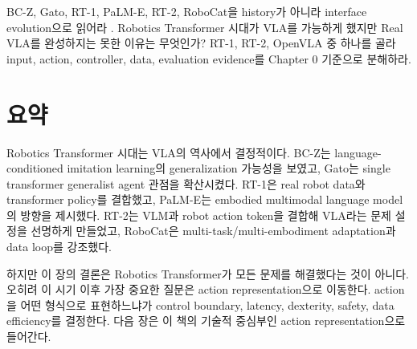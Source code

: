 \chapterwork
{BC-Z, Gato, RT-1, PaLM-E, RT-2, RoboCat을 history가 아니라 interface evolution으로 읽어라 \cite{bcz2022,gato2022,rt12022,palme2023,rt22023,robocat2023}.}
{Robotics Transformer 시대가 VLA를 가능하게 했지만 Real VLA를 완성하지는 못한 이유는 무엇인가?}
{RT-1, RT-2, OpenVLA 중 하나를 골라 input, action, controller, data, evaluation evidence를 Chapter 0 기준으로 분해하라.}

\section{요약}

Robotics Transformer 시대는 VLA의 역사에서 결정적이다. BC-Z는 language-conditioned imitation learning의 generalization 가능성을 보였고, Gato는 single transformer generalist agent 관점을 확산시켰다. RT-1은 real robot data와 transformer policy를 결합했고, PaLM-E는 embodied multimodal language model의 방향을 제시했다. RT-2는 VLM과 robot action token을 결합해 VLA라는 문제 설정을 선명하게 만들었고, RoboCat은 multi-task/multi-embodiment adaptation과 data loop를 강조했다.

하지만 이 장의 결론은 Robotics Transformer가 모든 문제를 해결했다는 것이 아니다. 오히려 이 시기 이후 가장 중요한 질문은 action representation으로 이동한다. action을 어떤 형식으로 표현하느냐가 control boundary, latency, dexterity, safety, data efficiency를 결정한다. 다음 장은 이 책의 기술적 중심부인 action representation으로 들어간다.
